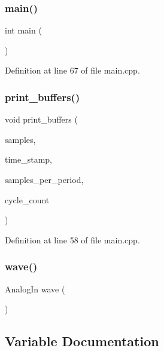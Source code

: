 \mbox{\label{main_8cpp_a840291bc02cba5474a4cb46a9b9566fe}} 
\subsubsection{main()}
{\footnotesize\ttfamily int main (\begin{DoxyParamCaption}\item[{void}]{ }\end{DoxyParamCaption})}



Definition at line 67 of file main.\+cpp.

\mbox{\label{main_8cpp_a3f2309771391ea2eb70a7b2c0d3c72bb}} 
\subsubsection{print\_buffers()}
{\footnotesize\ttfamily void print\+\_\+buffers (\begin{DoxyParamCaption}\item[{float $\ast$}]{samples,  }\item[{uint16\+\_\+t $\ast$}]{time\+\_\+stamp,  }\item[{uint16\+\_\+t}]{samples\+\_\+per\+\_\+period,  }\item[{uint16\+\_\+t}]{cycle\+\_\+count }\end{DoxyParamCaption})}



Definition at line 58 of file main.\+cpp.

\mbox{\label{main_8cpp_a296f426d06523200562e024bb052e097}} 
\subsubsection{wave()}
{\footnotesize\ttfamily Analog\+In wave (\begin{DoxyParamCaption}\item[{P\+A\+\_\+0}]{ }\end{DoxyParamCaption})}



\subsection{Variable Documentation}
\mbox{\label{main_8cpp_a87cbf3c595589eb5828214202b51a2ba}} 
